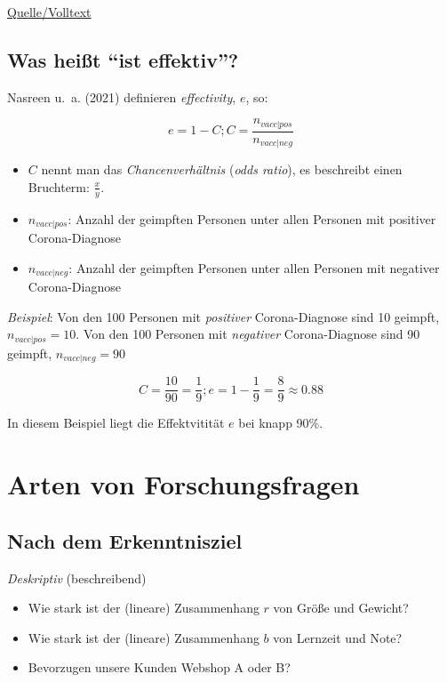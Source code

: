 \documentclass[
  a4paper,
  DIV=11]{scrreprt}
\providecommand{\tightlist}{%
  \setlength{\itemsep}{0pt}\setlength{\parskip}{0pt}}\usepackage{longtable,booktabs,array}
\theoremstyle{definition}
\theoremstyle{remark}
\begin{document}
\href{https://www.nature.com/articles/s41586-021-03843-2}{Quelle/Volltext}

\hypertarget{was-heiuxdft-ist-effektiv}{%
\subsection{Was heißt ``ist
effektiv''?}\label{was-heiuxdft-ist-effektiv}}

Nasreen u.~a. (2021) definieren \emph{effectivity}, \(e\), so:

\[e = 1 - C; C= \frac{n_{vacc|pos}}{n_{vacc|neg}}\]

\begin{itemize}
\tightlist
\item
  \(C\) nennt man das \emph{Chancenverhältnis} (\emph{odds ratio}), es
  beschreibt einen Bruchterm: \(\frac{x}{y}\).
\item
  \(n_{vacc|pos}\): Anzahl der geimpften Personen unter allen Personen
  mit positiver Corona-Diagnose
\item
  \(n_{vacc|neg}\): Anzahl der geimpften Personen unter allen Personen
  mit negativer Corona-Diagnose
\end{itemize}

\emph{Beispiel}: Von den 100 Personen mit \emph{positiver}
Corona-Diagnose sind 10 geimpft, \(n_{vacc|pos}=10\). Von den 100
Personen mit \emph{negativer} Corona-Diagnose sind 90 geimpft,
\(n_{vacc|neg}=90\)

\[C= \frac{10}{90} = \frac{1}{9}; e = 1 - \frac{1}{9} = \frac{8}{9} \approx 0.88\]

In diesem Beispiel liegt die Effektvitität \(e\) bei knapp 90\%.

\hypertarget{arten-von-forschungsfragen}{%
\section{Arten von Forschungsfragen}\label{arten-von-forschungsfragen}}

\hypertarget{nach-dem-erkenntnisziel}{%
\subsection{Nach dem Erkenntnisziel}\label{nach-dem-erkenntnisziel}}

\emph{Deskriptiv} (beschreibend)

\begin{itemize}
\tightlist
\item
  Wie stark ist der (lineare) Zusammenhang \(r\) von Größe und Gewicht?
\item
  Wie stark ist der (lineare) Zusammenhang \(b\) von Lernzeit und Note?
\item
  Bevorzugen unsere Kunden Webshop A oder B?
\end{itemize}
\end{document}
